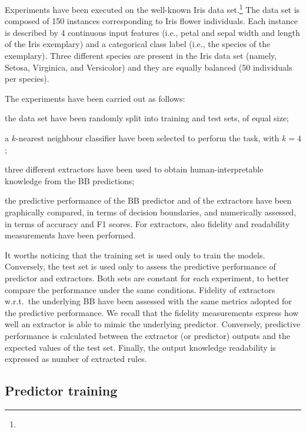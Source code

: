 \documentclass[
]{ceurart}
\begin{document}
Experiments have been executed on the well-known Iris data set.\footnote{}
%
The data set is composed of 150 instances corresponding to Iris flower individuals.
%
Each instance is described by 4 continuous input features (i.e., petal and sepal width and length of the Iris exemplary) and a categorical class label (i.e., the species of the exemplary).
%
Three different species are present in the Iris data set (namely, Setosa, Virginica, and Versicolor) and they are equally balanced (50 individuals per species).

The experiments have been carried out as follows:
%
\begin{inlinelist}
	\item the data set have been randomly split into training and test sets, of equal size;
	\item a $k$-nearest neighbour classifier have been selected to perform the task, with $k=4$;
	\item three different extractors have been used to obtain human-interpretable knowledge from the BB predictions;
	\item the predictive performance of the BB predictor and of the extractors have been graphically compared, in terms of decision boundaries, and numerically assessed, in terms of accuracy and F1 scores. For extractors, also fidelity and readability measurements have been performed.
\end{inlinelist}
%
It worths noticing that the training set is used only to train the models.
%
Conversely, the test set is used only to assess the predictive performance of predictor and extractors.
%
Both sets are constant for each experiment, to better compare the performance under the same conditions.
%
Fidelity of extractors w.r.t.\ the underlying BB have been assessed with the same metrics adopted for the predictive performance.
%
We recall that the fidelity measurements express how well an extractor is able to mimic the underlying predictor.
%
Conversely, predictive performance is calculated between the extractor (or predictor) outputs and the expected values of the test set.
%
Finally, the output knowledge readability is expressed as number of extracted rules.

\subsection{Predictor training}


\end{document}
